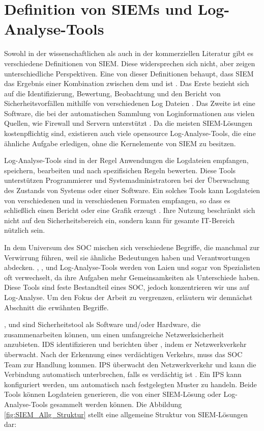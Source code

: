 \section{Definition von SIEMs und Log-Analyse-Tools}

Sowohl in der wissenschaftlichen als auch in der kommerziellen Literatur gibt es verschiedene Definitionen von \gls{SIEM}. Diese widersprechen sich nicht, aber zeigen unterschiedliche Perspektiven. Eine von dieser Definitionen behaupt, dass \gls{SIEM} das Ergebnis einer Kombination zwischen dem  und  ist \citep{Dorigo_SIEM}. Das Erste bezieht sich auf die Identifizierung, Bewertung, Beobachtung und den Bericht von Sicherheitsvorfällen mithilfe von verschiedenen Log Dateien \citep{techopedia_SEM}. Das Zweite ist eine Software, die bei der automatischen Sammlung von Loginformationen aus vielen Quellen, wie Firewall und Servern unterstützt \citep{techopedia_SIM}. Da die meisten \gls{SIEM}-Lösungen kostenpflichtig sind, existieren auch viele \gls{opensource} Log-Analyse-Tools, die eine ähnliche Aufgabe erledigen, ohne die Kernelemente von \gls{SIEM} zu besitzen.

Log-Analyse-Tools sind in der Regel Anwendungen die Logdateien empfangen, speichern, bearbeiten und nach spezifisichen Regeln bewerten. Diese Tools unterstützen Programmierer und Systemadministratoren bei der Überwachung des Zustands von Systems oder einer Software. Ein solches Tools kann Logdateien von verschiedenen  und in verschiedenen Formaten empfangen, so dass es schließlich einen Bericht oder eine Grafik erzeugt \citep{Korzeniowski_LATDef}. Ihre Nutzung beschränkt sich nicht auf den Sicherheitsbereich ein, sondern kann für gesamte IT-Bereich nützlich sein.

In dem Universum des \gls{SOC} mischen sich verschiedene Begriffe, die manchmal zur Verwirrung führen, weil sie ähnliche Bedeutungen haben und Verantwortungen abdecken. , ,  und Log-Analyse-Tools werden von Laien und sogar von Spezialisten oft verwechselt, da ihre Aufgaben mehr Gemeinsamkeiten als Unterschiede haben. Diese Tools sind feste Bestandteil eines \gls{SOC}, jedoch konzentrieren wir uns auf Log-Analyse. Um den Fokus der Arbeit zu vergrenzen, erläutern wir demnächst Abschnitt die erwähnten Begriffe.

,  und  sind Sicherheitstool als Software und/oder Hardware, die zusammenarbeiten können, um einen umfangreiche Netzwerksicherheit anzubieten. \gls{IDS} identifizieren und berichten über , indem er Netzwerkverkehr überwacht. Nach der Erkennung eines verdächtigen Verkehrs, muss das \gls{SOC} Team zur Handlung kommen. \gls{IPS} überwacht den Netzwerkverkehr und kann die Verbindung automatisch unterbrechen, falls es verdächtig ist \citep{Wendzel_IS}. Ein \gls{IPS} kann konfiguriert werden, um automatisch nach festgelegten Muster zu handeln. Beide Tools können Logdateien generieren, die von einer \gls{SIEM}-Lösung oder Log-Analyse-Tools gesammelt werden können. Die Abbildung \ref{fig:SIEM_Allg_Struktur} stellt eine allgemeine Struktur von \gls{SIEM}-Lösungen dar:

